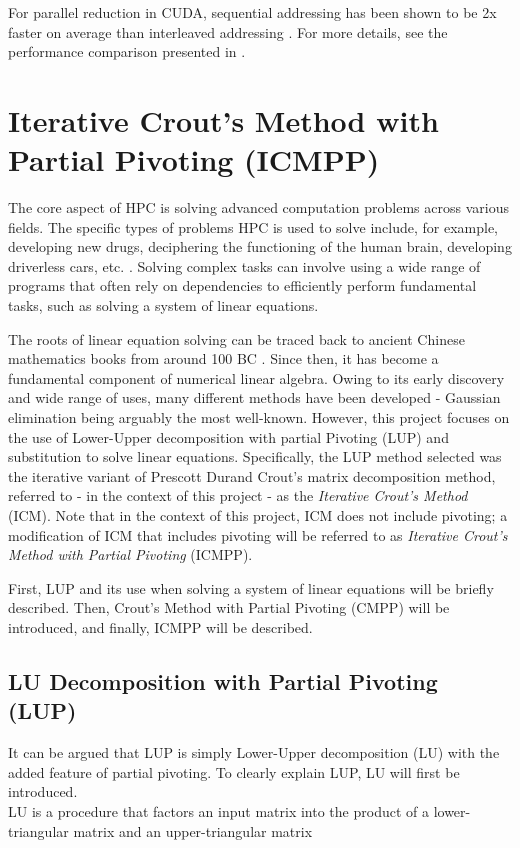For parallel reduction in CUDA, sequential addressing has been shown to be 2x faster on average than interleaved addressing \cite{Harris2023}. For more details, see the performance comparison presented in  \cite{Harris2023}.



\section{Iterative Crout's Method with Partial Pivoting (ICMPP)}\label{Section:theory->ICMPP}
The core aspect of HPC is solving advanced computation problems across various fields.
The specific types of problems HPC is used to solve include, for example, developing new drugs, deciphering the functioning of the human brain, developing driverless cars, etc. \cite{HY9P0YzuUCw5E5cs}.
Solving complex tasks can involve using a wide range of programs that often rely on dependencies to efficiently perform fundamental tasks, such as solving a system of linear equations.

The roots of linear equation solving can be traced back to ancient Chinese mathematics books from around 100 BC \cite{Hart2011}.
Since then, it has become a fundamental component of numerical linear algebra.
Owing to its early discovery and wide range of uses, many different methods have been developed - Gaussian elimination being arguably the most well-known.
However, this project focuses on the use of Lower-Upper decomposition with partial Pivoting (LUP) and substitution to solve linear equations.
Specifically, the LUP method selected was the iterative variant of Prescott Durand Crout's matrix decomposition method, referred to - in the context of this project - as the \textit{Iterative Crout's Method} (ICM).
Note that in the context of this project, ICM does not include pivoting; a modification of ICM that includes pivoting will be referred to as \textit{Iterative Crout's Method with Partial Pivoting} (ICMPP).

First, LUP and its use when solving a system of linear equations will be briefly described.
Then, Crout's Method with Partial Pivoting (CMPP) will be introduced, and finally, ICMPP will be described.

\subsection{LU Decomposition with Partial Pivoting (LUP)}\label{Subsection:theory->ICMPP->LUP}
It can be argued that LUP is simply Lower-Upper decomposition (LU) with the added feature of partial pivoting.
To clearly explain LUP, LU will first be introduced.\\
LU is a procedure that factors an input matrix into the product of a lower-triangular matrix and an upper-triangular matrix

